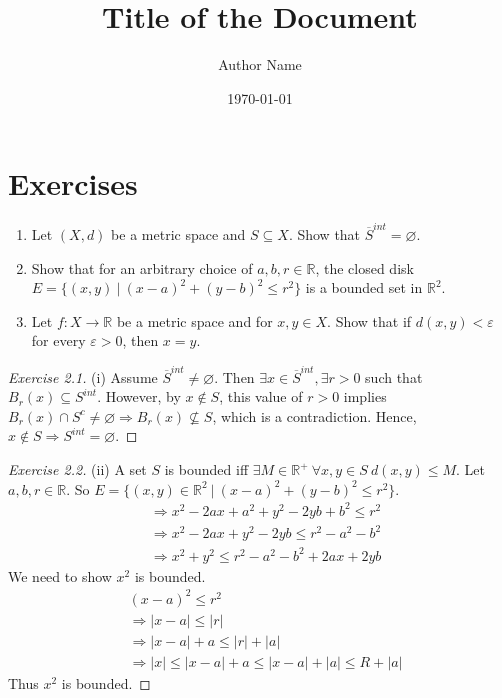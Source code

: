 \documentclass{article}
\title{\textbf{Title of the Document}}
\author{Author Name}
\date{\today}
\theoremstyle{definition}
\numberwithin{equation}{section}
\begin{document}
\maketitle
\tableofcontents
\newpage
\section{Exercises}
\begin{enumerate}
    \item Let $(X,d)$ be a metric space and $S \subseteq X$. Show that $\overline{S}^{int} = \varnothing$.
    \item Show that for an arbitrary choice of $a,b,r \in \mathbb{R}$, the closed disk $E = \{(x,y) \ | \ (x-a)^2 + (y-b)^2 \leq r^2\}$ is a bounded set in $\mathbb{R}^2$.
    \item Let $f: X \to \mathbb{R}$ be a metric space and for $x,y \in X$. Show that if $d(x,y) < \varepsilon$ for every $\varepsilon > 0$, then $x = y$.
\end{enumerate}

\begin{proof}[Exercise 2.1]
(i) Assume $\overline{S}^{int} \neq \varnothing$. Then $\exists x \in \overline{S}^{int}, \exists r > 0$ such that $B_r(x) \subseteq S^{int}$. However, by $x \notin S$, this value of $r > 0$ implies $B_r(x) \cap S^c \neq \varnothing \Rightarrow B_r(x) \nsubseteq S$, which is a contradiction. Hence, $x \notin S \Rightarrow S^{int} = \varnothing$.
\end{proof}

\begin{proof}[Exercise 2.2]
(ii) A set $S$ is bounded iff $\exists M \in \mathbb{R}^+ \ \forall x, y \in S \ d(x, y) \leq M$. Let $a, b, r \in \mathbb{R}$. So $E = \{(x, y) \in \mathbb{R}^2 \ | \ (x-a)^2 + (y-b)^2 \leq r^2\}$. 
\begin{align*}
&\Rightarrow x^2 - 2ax + a^2 + y^2 - 2yb + b^2 \leq r^2 \\
&\Rightarrow x^2 - 2ax + y^2 - 2yb \leq r^2 - a^2 - b^2 \\
&\Rightarrow x^2 + y^2 \leq r^2 - a^2 - b^2 + 2ax + 2yb
\end{align*}
We need to show $x^2$ is bounded.
\begin{align*}
&(x-a)^2 \leq r^2 \\
&\Rightarrow |x-a| \leq |r| \\
&\Rightarrow |x-a| + a \leq |r| + |a| \\
&\Rightarrow |x| \leq |x-a| + a \leq |x-a| + |a| \leq R + |a|
\end{align*}
Thus $x^2$ is bounded.
\end{proof}
\end{document}
